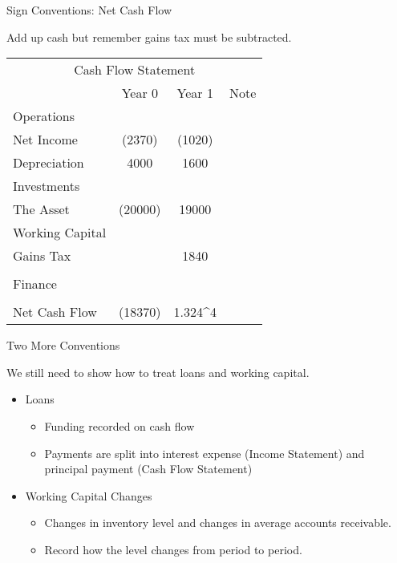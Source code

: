 \documentclass[ignorenonframetext,]{beamer}
\providecommand{\tightlist}{%
  \setlength{\itemsep}{0pt}\setlength{\parskip}{0pt}}
\begin{document}
\begin{frame}{Sign Conventions: Net Cash Flow}

Add up cash but remember gains tax must be subtracted.

\begin{table}
\begin{tabular}{l||c|c||p{3cm}}
        \multicolumn{4}{c}{Cash Flow Statement}\\
  &Year 0  &Year 1  &Note\\        
    Operations& &   &\\
    \hspace{.25in}Net Income    &   (2370)& (1020)&\\
    \hspace{.25in}Depreciation  &   4000&   1600&\\
    Investments &   &   &\\
\hspace{.25in}The Asset         &(20000)    &   19000&\\
\hspace{.25in}Working Capital   &   &   &\\
        \hspace{.25in}Gains Tax &   &1840   &\\
            &   &   &\\
        
    Finance &   &   &\\
            &   &   &\\
        \hline
        Net Cash Flow   &   (18370)& 1.324\times 10^{4} &\\
\end{tabular}
\end{table}

\end{frame}

\begin{frame}{Two More Conventions}

We still need to show how to treat loans and working capital.

\begin{itemize}
\tightlist
\item
  Loans

  \begin{itemize}
  \tightlist
  \item
    Funding recorded on cash flow
  \item
    Payments are split into interest expense (Income Statement) and
    principal payment (Cash Flow Statement)
  \end{itemize}
\item
  Working Capital Changes

  \begin{itemize}
  \tightlist
  \item
    Changes in inventory level and changes in average accounts
    receivable.
  \item
    Record how the level changes from period to period.
  \end{itemize}
\end{itemize}

\end{frame}
\end{document}

